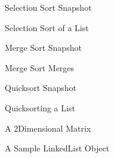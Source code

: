 \documentclass[letterpaper,10pt,english]{sphinxmanual}
\begin{document}
\begin{figure}[htbp]
\centering
\capstart

\noindent{}
\caption{Selection Sort Snapshot}\label{\detokenize{chap4/chap4:id3}}\end{figure}

\begin{figure}[htbp]
\centering
\capstart

\noindent{}
\caption{Selection Sort of a List}\label{\detokenize{chap4/chap4:id4}}\end{figure}

\begin{figure}[htbp]
\centering
\capstart

\noindent{}
\caption{Merge Sort Snapshot}\label{\detokenize{chap4/chap4:id5}}\end{figure}

\begin{figure}[htbp]
\centering
\capstart

\noindent{}
\caption{Merge Sort Merges}\label{\detokenize{chap4/chap4:id6}}\end{figure}

\begin{figure}[htbp]
\centering
\capstart

\noindent{}
\caption{Quicksort Snapshot}\label{\detokenize{chap4/chap4:id7}}\end{figure}

\begin{figure}[htbp]
\centering
\capstart

\noindent{}
\caption{Quicksorting a List}\label{\detokenize{chap4/chap4:id8}}\end{figure}

\begin{figure}[htbp]
\centering
\capstart

\noindent{}
\caption{A 2\sphinxhyphen{}Dimensional Matrix}\label{\detokenize{chap4/chap4:id9}}\end{figure}

\begin{figure}[htbp]
\centering
\capstart

\noindent{}
\caption{A Sample LinkedList Object}\label{\detokenize{chap4/chap4:id10}}\end{figure}
\end{document}
